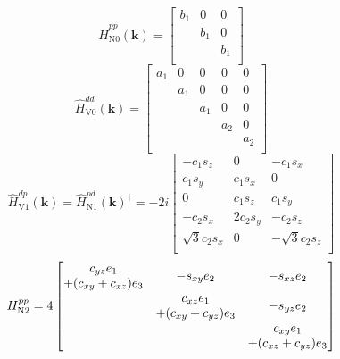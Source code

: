 \documentclass[twocolumn,showpacs,preprintnumbers,superscriptaddress,prb,floatfix,aps,10pt]{revtex4-1}
\renewcommand{\vec}[1]{\ensuremath{\mathbf{#1}}}
\newcommand*{\ham}{\hat{H}}
\begin{document}
\begin{widetext}
\begin{equation}
\label{eq:0pp}
\ham_{\textrm{N0}}^{pp}(\vec{k})=
\begin{bmatrix}
b_{1} & 0     & 0\\
      & b_{1} & 0\\
      &       & b_{1}\\
\end{bmatrix}
\end{equation}
%
\begin{equation}
\label{eq:0dd}
\ham_{\textrm{V0}}^{dd}(\vec{k})=
\begin{bmatrix}
a_{1} & 0     & 0     & 0     & 0\\
      & a_{1} & 0     & 0     & 0\\
      &       & a_{1} & 0     & 0\\
      &       &       & a_{2} & 0\\
      &       &       &       & a_{2}\\
\end{bmatrix}
\end{equation}
%
\begin{equation}
\ham_{\textrm{V1}}^{dp}(\vec{k}) = \ham_{\textrm{N}1}^{pd}(\vec{k})^\dag =-2i
\begin{bmatrix}
-c_{1}s_{z}        & 0           & -c_{1}s_{x}\\
c_{1}s_{y}         & c_{1}s_{x}  & 0\\
0                  & c_{1}s_{z}  & c_{1}s_{y}\\
-c_{2}s_{x}        & 2c_{2}s_{y} & -c_{2}s_{z}\\
\sqrt{3}c_{2}s_{x} & 0           & -\sqrt{3}c_{2}s_{z}\\
\end{bmatrix}
\end{equation}
%
\begin{equation}
H_{\textrm{N2}}^{pp}=4
\begin{bmatrix}
c_{yz}e_{1}           & \multirow{2}{*}{$-s_{xy}e_{2}$} & \multirow{2}{*}{$-s_{xz}e_{2}$}\\
+(c_{xy}+c_{xz})e_{3} &                                 & \\
\multirow{2}{*}{ }    & c_{xz}e_{1}                     & \multirow{2}{*}{$-s_{yz}e_{2}$}\\
                      & +(c_{xy}+c_{yz})e_{3}           & \\
\multirow{2}{*}{ }    & \multirow{2}{*}{ }              & c_{xy}e_{1} \\
                      &                                 & +(c_{xz}+c_{yz})e_{3}\\

\end{bmatrix}
\end{equation}
\end{widetext}
\end{document}
